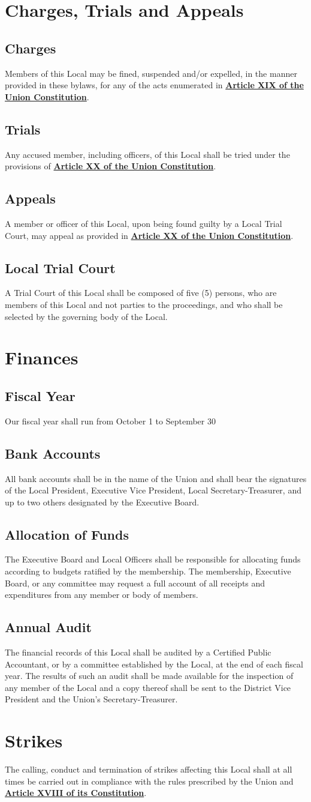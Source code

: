 \documentclass[11pt]{article}
\let\oldhref\href
\renewcommand{\href}[2]{\oldhref{#1}{\bfseries#2}}
\newcommand{\article}[1]{\vspace{.50cm}\section{#1}}
\newcommand{\articlesection}[1]{\vspace{.25cm}\subsection{#1}}
\begin{document}
\article{Charges, Trials and Appeals}
\articlesection{Charges}
Members of this Local may be fined, suspended and/or expelled, in the manner provided in these bylaws, for any of  the acts enumerated in \href{https://cwa-union.org/for-locals/cwa-constitution\#A19}{Article XIX of the Union Constitution}.

\articlesection{Trials}
Any accused member, including officers, of this Local shall be tried under the provisions of \href{https://cwa-union.org/for-locals/cwa-constitution\#A20}{Article XX of the Union  Constitution}.

\articlesection{Appeals}
A member or officer of this Local, upon being found guilty by a Local Trial Court, may appeal as provided in \href{https://cwa-union.org/for-locals/cwa-constitution\#A20}{Article XX of the Union Constitution}.

\articlesection{Local Trial Court}
A Trial Court of this Local shall be composed of five (5) persons, who are members of this Local and not parties to the proceedings, and who shall be selected by the governing body of the Local.

\article{Finances}
\articlesection{Fiscal Year}
Our fiscal year shall run from October 1 to September 30

\articlesection{Bank Accounts}
All bank accounts shall be in the name of the Union and shall bear the signatures of the Local President, Executive Vice President, Local Secretary-Treasurer, and up to two others designated by the Executive Board.

\articlesection{Allocation of Funds}
The Executive Board and Local Officers shall be responsible for allocating funds according to budgets ratified by the membership. The membership, Executive Board, or any committee may request a full account of all receipts and expenditures from any member or body of members.

\articlesection{Annual Audit}
The financial records of this Local shall be audited by a Certified Public Accountant, or by a committee established by the Local, at the end of each fiscal year. The results of such an audit shall be made available for the inspection of any member of the Local and a copy thereof shall be sent to the District Vice President and the Union’s Secretary-Treasurer.

\article{Strikes}
The calling, conduct and termination of strikes affecting this Local shall at all times be carried out in compliance with the rules prescribed by the Union and \href{https://cwa-union.org/for-locals/cwa-constitution\#A18}{Article XVIII of its Constitution}.
\end{document}
